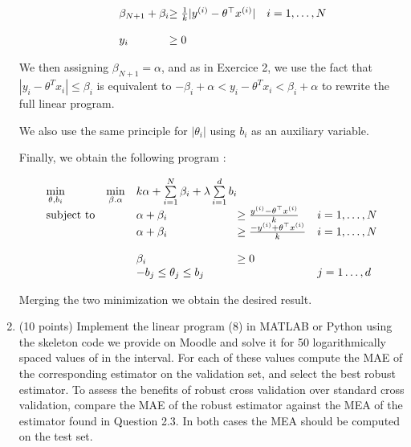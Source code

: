 \documentclass[10pt]{article}
\newenvironment{exercise}[2][Exercise]{\begin{trivlist}
  \item[\hskip \labelsep {\bfseries #1}\hskip \labelsep {\bfseries #2.}]}{\end{trivlist}}
\begin{document}
\begin{exercise}{7}
\begin{enumerate}
\begin{equation*}
\begin{array}{lll@{}lll}
&&  \beta_{N + 1 } + \beta_i   & \geq \frac{1}{k}|y^{(i)} - \theta^\top x^{(i)}| &  i=1 ,\dots, N \\
                \\
                && y_i    &  \geq 0 %
\end{array}
\end{equation*}

We then assigning $\beta_{N+1} = \alpha$, and as in Exercice 2, we use the fact that $|y_i - \theta^T x_i| \leq \beta_i$ is equivalent to $-\beta_i + \alpha < y_i - \theta^T x_i  < \beta_i + \alpha$ to rewrite the full linear program. 

We also use the same principle for $|\theta_i|$ using $b_i$ as an auxiliary variable. 

Finally, we obtain the following program : 

\begin{equation*}
\begin{array}{lll@{}lll}
 \min\limits_{\theta, b_i} &\min\limits_{\beta. \alpha}   &  k\alpha  + \sum\limits_{i=1}^{N}\beta_i  + \lambda\sum\limits_{i=1}^{d} b_i   &\\
\text{subject to} 

&&  \alpha + \beta_i    & \geq \frac{ y^{(i)} - \theta^\top x^{(i)}}{k}&  i=1 ,\dots, N \\
&&  \alpha + \beta_i    & \geq \frac{- y^{(i)} + \theta^\top x^{(i)}}{k} &  i=1 ,\dots, N \\
                \\
                && \beta_i    & \geq 0  & \\ %
                && - b_j \leq \theta_j \leq b_j & & j = 1 \dots, d
\end{array}
\end{equation*}

Merging the two minimization we obtain the desired result. 



\item  (10 points) Implement the linear program (8) in MATLAB or Python using the skeleton code we provide on Moodle and solve it for 50 logarithmically spaced values of in the interval. For each of these values compute the MAE of the corresponding estimator on the validation set, and select the best robust estimator. To assess the benefits of robust cross validation over standard cross validation, compare the MAE of the robust estimator against the MEA of the estimator found in Question 2.3. In both cases the MEA should be computed on the test set.


\end{enumerate}
\end{exercise}
\end{document}

